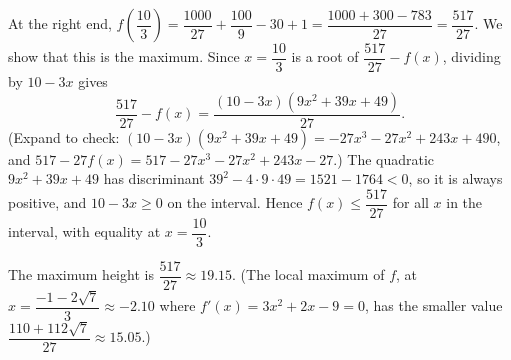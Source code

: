 At the right end, $f\left(\dfrac{10}3\right)=\dfrac{1000}{27}+\dfrac{100}{9}-30+1=\dfrac{1000+300-783}{27}=\dfrac{517}{27}$. We show that this is the maximum. Since $x=\dfrac{10}3$ is a root of $\dfrac{517}{27}-f(x)$, dividing by $10-3x$ gives
\[\dfrac{517}{27}-f(x)=\dfrac{(10-3x)\left(9x^2+39x+49\right)}{27}.\]
(Expand to check: $(10-3x)(9x^2+39x+49)=-27x^3-27x^2+243x+490$, and $517-27f(x)=517-27x^3-27x^2+243x-27$.) The quadratic $9x^2+39x+49$ has discriminant $39^2-4\cdot9\cdot49=1521-1764<0$, so it is always positive, and $10-3x\ge0$ on the interval. Hence $f(x)\le\dfrac{517}{27}$ for all $x$ in the interval, with equality at $x=\dfrac{10}3$.

The maximum height is $\boxed{\dfrac{517}{27}}\approx19.15$. (The local maximum of $f$, at $x=\dfrac{-1-2\sqrt7}{3}\approx-2.10$ where $f'(x)=3x^2+2x-9=0$, has the smaller value $\dfrac{110+112\sqrt7}{27}\approx15.05$.)
